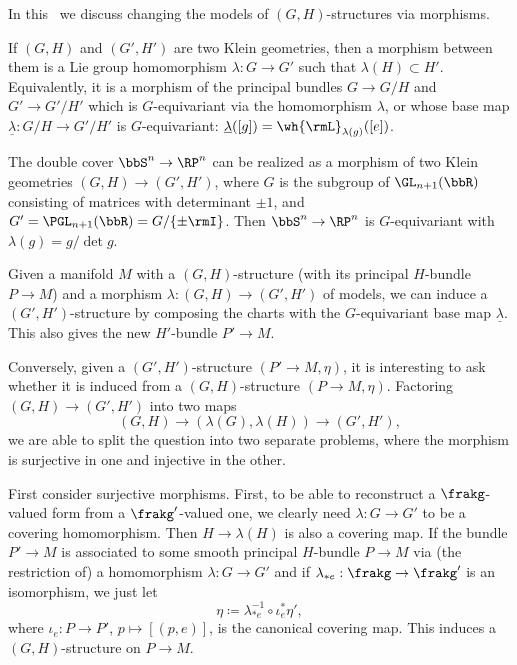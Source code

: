 In this \sect\ we discuss changing the models of $(G,H)$-structures via morphisms.

\begin{defn}
    If $(G,H)$ and $(G',H')$ are two Klein geometries, then a morphism between them is a Lie group homomorphism $\lambda:G\to G'$ such that $\lambda(H)\subset H'$. Equivalently, it is a morphism of the principal bundles $G\to G\slash H$ and $G'\to G'\slash H'$ which is $G$-equivariant via the homomorphism $\lambda$, or whose base map $\underline{\lambda}:G\slash H\to G'\slash H'$ is $G$-equivariant: $\underline{\lambda}([g])=\wh{\rmL}_{\lambda(g)}([e])$.
\end{defn}

\begin{example}
    The double cover $\bbS^n\to \RP^n$ can be realized as a morphism of two Klein geometries $(G,H)\to (G',H')$, where $G$ is the subgroup of $\GL_{n+1}(\bbR)$ consisting of matrices with determinant $\pm 1$, and $G'=\PGL_{n+1}(\bbR)=G\slash \{\pm \rmI\}$. Then $\bbS^n\to \RP^n$ is $G$-equivariant with $\lambda(g)=g/\det g$.
\end{example}

Given a manifold $M$ with a $(G,H)$-structure (with its principal $H$-bundle $P\to M$) and a morphism $\lambda:(G,H)\to (G',H')$ of models, we can induce a $(G',H')$-structure by composing the charts with the $G$-equivariant base map $\underline{\lambda}$. This also gives the new $H'$-bundle $P'\to M$.

Conversely, given a $(G',H')$-structure $(P'\to M,\eta)$, it is interesting to ask whether it is induced from a $(G,H)$-structure $(P\to M,\eta)$. Factoring $(G,H)\to (G',H')$ into two maps 
\[(G,H)\to (\lambda(G),\lambda(H))\to (G',H'),\]
we are able to split the question into two separate problems, where the morphism is surjective in one and injective in the other.

First consider surjective morphisms. First, to be able to reconstruct a $\frakg$-valued form from a $\frakg'$-valued one, we clearly need $\lambda:G\to G'$ to be a covering homomorphism. Then $H\to \lambda(H)$ is also a covering map. If the bundle $P'\to M$ is associated to some smooth principal $H$-bundle $P\to M$ via (the restriction of) a homomorphism $\lambda:G\to G'$ and if $\lambda_{\ast e}:\frakg\to \frakg'$ is an isomorphism, we just let 
\[\eta\coloneqq \lambda^{-1}_{\ast e}\circ \iota_e^\ast \eta',\] where $\iota_e:P\to P'$, $p\mapsto [(p,e)]$, is the canonical covering map. This induces a $(G,H)$-structure on $P\to M$. 

